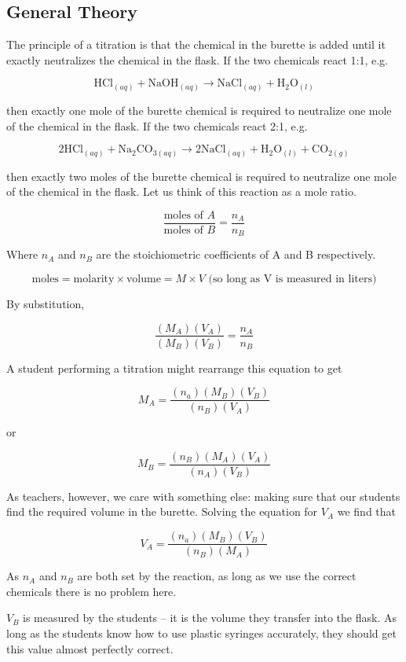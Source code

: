 \subsection{General Theory}

The principle of a titration is that the chemical in the burette is added until it exactly neutralizes the chemical in the flask. If the two chemicals react 1:1, e.g. 

\[ \mathrm{HCl}_{(aq)} + \mathrm{NaOH}_{(aq)} \longrightarrow \mathrm{NaCl}_{(aq)} + \mathrm{H}_{2}\mathrm{O}_{(l)} \]

then exactly one mole of the burette chemical is required to neutralize one mole of the chemical in the flask. If the two chemicals react 2:1, e.g. 

\[ 2\mathrm{HCl}_{(aq)} + \mathrm{Na}_{2}\mathrm{CO}_{3(aq)} \longrightarrow 2\mathrm{NaCl}_{(aq)} + \mathrm{H}_{2}\mathrm{O}_{(l)} + \mathrm{CO}_{2(g)} \]

then exactly two moles of the burette chemical is required to neutralize one mole of the chemical in the flask. Let us think of this reaction as a mole ratio.

\[ \frac{\mbox{moles of }A}{\mbox{moles of }B} = \frac{n_{A}}{n_{B}} \]

Where $ n_{A} $ and $ n_{B} $ are the stoichiometric coefficients of A and B respectively.

\[ \mathrm{moles} = \mathrm{molarity} \times \mathrm{volume} = M \times V \mbox{ (so long as V is measured in liters)} \]

By substitution,

\[ \frac{(M_{A})(V_{A})}{(M_{B})(V_{B})} = \frac{n_{A}}{n_{B}} \]

A student performing a titration might rearrange this equation to get

\[ M_{A} = \frac{(n_{a})(M_{B})(V_{B})}{(n_{B})(V_{A})} \]

or

\[ M_{B} = \frac{(n_{B})(M_{A})(V_{A})}{(n_{A})(V_{B})} \]

As teachers, however, we care with something else: making sure that our students find the required volume in the burette. Solving the equation for $ V_{A} $ we find that

\[ V_{A} = \frac{(n_{a})(M_{B})(V_{B})}{(n_{B})(M_{A})} \]

As $ n_{A} $ and $ n_{B} $ are both set by the reaction, as long as we use the correct chemicals there is no problem here.

$ V_{B} $ is measured by the students -- it is the volume they transfer into the flask. As long as the students know how to use plastic syringes accurately, they should get this value almost perfectly correct.

